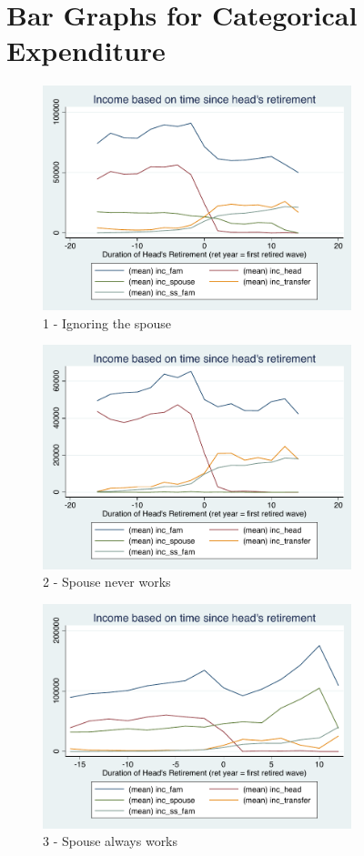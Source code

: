 \documentclass[11pt,onecolumn]{article}
\numberwithin{figure}{section}
\begin{document}
\section{Bar Graphs for Categorical Expenditure}

\begin{figure}[h]
	\caption{1 - Ignoring the spouse}
	\centering
	\includegraphics[width=0.8\textwidth]{../IncomeAroundRetirement/Income_with_spouse_definition_1.pdf}
\end{figure}

\begin{figure}[h]
	\caption{2 - Spouse never works}
	\centering
	\includegraphics[width=0.8\textwidth]{../IncomeAroundRetirement/Income_with_spouse_definition_2.pdf}
\end{figure}

\begin{figure}[h]
	\caption{3 - Spouse always works}
	\centering
	\includegraphics[width=0.8\textwidth]{../IncomeAroundRetirement/Income_with_spouse_definition_3.pdf}
\end{figure}
\end{document}
